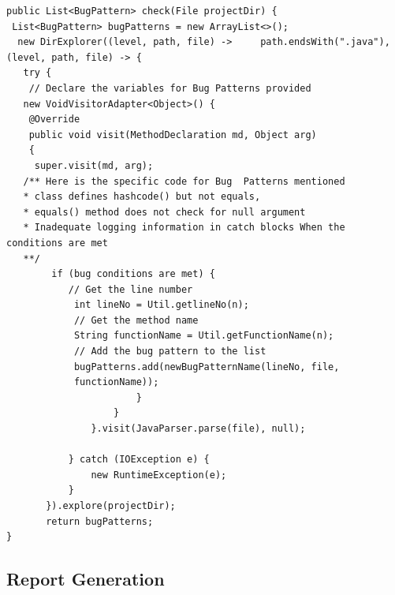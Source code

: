 \documentclass[sigplan,screen]{acmart}
\begin{document}
\begin{lstlisting}[caption={Common Checker function for all the three bug Patterns},captionpos=b]
public List<BugPattern> check(File projectDir) {
 List<BugPattern> bugPatterns = new ArrayList<>();
  new DirExplorer((level, path, file) ->     path.endsWith(".java"), (level, path, file) -> {
   try {
    // Declare the variables for Bug Patterns provided
   new VoidVisitorAdapter<Object>() {
    @Override
    public void visit(MethodDeclaration md, Object arg)
    {
     super.visit(md, arg);
   /** Here is the specific code for Bug  Patterns mentioned
   * class defines hashcode() but not equals, 
   * equals() method does not check for null argument 
   * Inadequate logging information in catch blocks When the conditions are met
   **/
        if (bug conditions are met) {
           // Get the line number
            int lineNo = Util.getlineNo(n);
            // Get the method name
            String functionName = Util.getFunctionName(n);
            // Add the bug pattern to the list
            bugPatterns.add(newBugPatternName(lineNo, file,
            functionName));
                       }
                   }
               }.visit(JavaParser.parse(file), null);

           } catch (IOException e) {
               new RuntimeException(e);
           }
       }).explore(projectDir);
       return bugPatterns;
}
\end{lstlisting}

\subsection{Report Generation}
\end{document}
